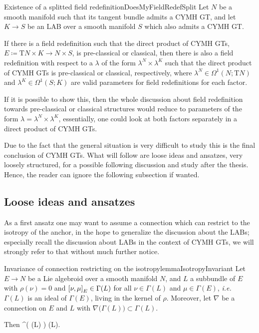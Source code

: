 \begin{conjectures}{Existence of a splitted field redefinition}{DoesMyFieldRedefSplit}
Let $N$ be a smooth manifold such that its tangent bundle admits a CYMH GT, and let $K \to S$ be an LAB over a smooth manifold $S$ which also admits a CYMH GT.

If there is a field redefinition such that the direct product of CYMH GTs,  $E \coloneqq \mathrm{T}N \times K \to N \times S$, is pre-classical or classical, then there is also a field redefinition with respect to a $\lambda$ of the form $\lambda^N \times \lambda^K$ such that the direct product of CYMH GTs is pre-classical or classical, respectively, where $\lambda^N \in \Omega^1(N; \mathrm{T}N)$ and $\lambda^K \in \Omega^1(S;K)$ are valid parameters for field redefinitions for each factor.
\end{conjectures}

If it is possible to show this, then the whole discussion about field redefinition towards pre-classical or classical structures would reduce to parameters of the form $\lambda = \lambda^N \times \lambda^K$, essentially, one could look at both factors separately in a direct product of CYMH GTs.

Due to the fact that the general situation is very difficult to study this is the final conclusion of CYMH GTs. What will follow are loose ideas and ansatzes, very loosely structured, for a possible following discussion and study after the thesis. Hence, the reader can ignore the following subsection if wanted.

\subsection{Loose ideas and ansatzes}\label{LastAnsatzes}

As a first ansatz one may want to assume a connection which can restrict to the isotropy of the anchor, in the hope to generalize the discussion about the LABs; especially recall the discussion about LABs in the context of CYMH GTs, we will strongly refer to that without much further notice.

\begin{lemmata}{Invariance of connection restricting on the isotropy}{lemmaIsotropyInvariant}
Let $E\to N$ be a Lie algebroid over a smooth manifold $N$, and $L$ a subbundle of $E$ with $\rho(\nu) = 0$ and $\mleft[ \nu, \mu \mright]_E \in \Gamma(L)$ for all $\nu \in \Gamma(L)$ and $\mu \in \Gamma(E)$, \textit{i.e.}~$\Gamma(L)$ is an ideal of $\Gamma(E)$, living in the kernel of $\rho$. Moreover, let $\nabla$ be a connection on $E$ and $L$ with $\nabla \bigl( \Gamma(L) \bigr) \subset \Gamma(L)$.

Then
\ba
\widetilde{\nabla}^\lambda \bigl( \Gamma(L) \bigr) \subset \Gamma(L).
\ea
\end{lemmata}

